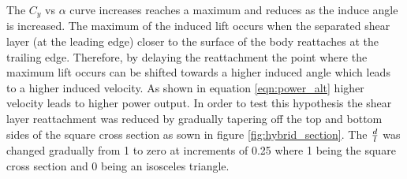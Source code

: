 The $C_y$ vs $\alpha$ curve increases reaches a maximum and reduces as the induce angle is increased. The maximum of the induced lift occurs when the separated  shear layer (at the leading edge) closer to the surface of the body reattaches at the trailing edge. Therefore, by delaying the reattachment the point where the maximum lift occurs can be shifted towards a higher induced angle which leads to a higher induced velocity. As shown in equation \ref{eqn:power_alt} higher velocity leads to higher power output. In order to test this hypothesis the shear layer reattachment was reduced by gradually tapering off the top and bottom sides of the square cross section as sown in figure \ref{fig:hybrid_section}. The $\frac{d}{l}$ was changed gradually from 1 to zero at increments of 0.25 where 1 being the square cross section and 0 being an isosceles triangle.    













